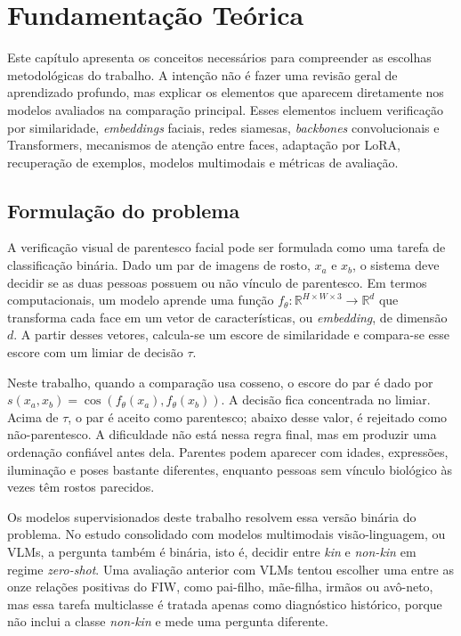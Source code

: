 \chapter[Fundamentação Teórica]{Fundamentação Teórica}
\label{cap:fundamentacao-teorica}

Este capítulo apresenta os conceitos necessários para compreender as escolhas metodológicas do trabalho. A intenção não é fazer uma revisão geral de aprendizado profundo, mas explicar os elementos que aparecem diretamente nos modelos avaliados na comparação principal. Esses elementos incluem verificação por similaridade, \textit{embeddings} faciais, redes siamesas, \textit{backbones} convolucionais e Transformers, mecanismos de atenção entre faces, adaptação por LoRA, recuperação de exemplos, modelos multimodais e métricas de avaliação.

\section{Formulação do problema}

A verificação visual de parentesco facial pode ser formulada como uma tarefa de classificação binária. Dado um par de imagens de rosto, $x_a$ e $x_b$, o sistema deve decidir se as duas pessoas possuem ou não vínculo de parentesco. Em termos computacionais, um modelo aprende uma função $f_\theta : \mathbb{R}^{H \times W \times 3} \to \mathbb{R}^d$ que transforma cada face em um vetor de características, ou \textit{embedding}, de dimensão $d$. A partir desses vetores, calcula-se um escore de similaridade e compara-se esse escore com um limiar de decisão $\tau$.

Neste trabalho, quando a comparação usa cosseno, o escore do par é dado por $s(x_a, x_b) = \cos(f_\theta(x_a), f_\theta(x_b))$. A decisão fica concentrada no limiar. Acima de $\tau$, o par é aceito como parentesco; abaixo desse valor, é rejeitado como não-parentesco. A dificuldade não está nessa regra final, mas em produzir uma ordenação confiável antes dela. Parentes podem aparecer com idades, expressões, iluminação e poses bastante diferentes, enquanto pessoas sem vínculo biológico às vezes têm rostos parecidos.

Os modelos supervisionados deste trabalho resolvem essa versão binária do problema. No estudo consolidado com modelos multimodais visão-linguagem, ou VLMs, a pergunta também é binária, isto é, decidir entre \textit{kin} e \textit{non-kin} em regime \textit{zero-shot}. Uma avaliação anterior com VLMs tentou escolher uma entre as onze relações positivas do FIW, como pai-filho, mãe-filha, irmãos ou avô-neto, mas essa tarefa multiclasse é tratada apenas como diagnóstico histórico, porque não inclui a classe \textit{non-kin} e mede uma pergunta diferente.

